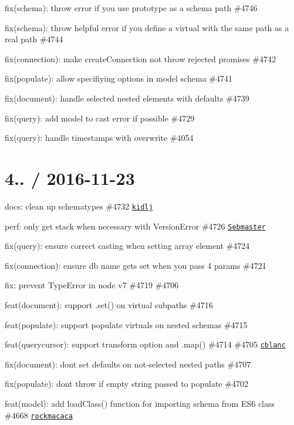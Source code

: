 \begin{DoxyItemize}
\item fix(schema)\+: throw error if you use prototype as a schema path \#4746
\item fix(schema)\+: throw helpful error if you define a virtual with the same path as a real path \#4744
\item fix(connection)\+: make create\+Connection not throw rejected promises \#4742
\item fix(populate)\+: allow specifiying options in model schema \#4741
\item fix(document)\+: handle selected nested elements with defaults \#4739
\item fix(query)\+: add model to cast error if possible \#4729
\item fix(query)\+: handle timestamps with overwrite \#4054
\end{DoxyItemize}

\section*{4.. / 2016-\/11-\/23 }


\begin{DoxyItemize}
\item docs\+: clean up schematypes \#4732 \href{https://github.com/kidlj}{\tt kidlj}
\item perf\+: only get stack when necessary with Version\+Error \#4726 \href{https://github.com/Sebmaster}{\tt Sebmaster}
\item fix(query)\+: ensure correct casting when setting array element \#4724
\item fix(connection)\+: ensure db name gets set when you pass 4 params \#4721
\item fix\+: prevent Type\+Error in node v7 \#4719 \#4706
\item feat(document)\+: support .set() on virtual subpaths \#4716
\item feat(populate)\+: support populate virtuals on nested schemas \#4715
\item feat(querycursor)\+: support transform option and .map() \#4714 \#4705 \href{https://github.com/cblanc}{\tt cblanc}
\item fix(document)\+: dont set defaults on not-\/selected nested paths \#4707
\item fix(populate)\+: don\textquotesingle{}t throw if empty string passed to populate \#4702
\item feat(model)\+: add {\ttfamily load\+Class()} function for importing schema from E\+S6 class \#4668 \href{https://github.com/rockmacaca}{\tt rockmacaca}
\end{DoxyItemize}

